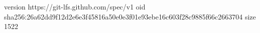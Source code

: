 version https://git-lfs.github.com/spec/v1
oid sha256:26a62dd9f12d2e6e3f45816a50e0e3f01e93ebe16c603f28c9885f66c2663704
size 1522
